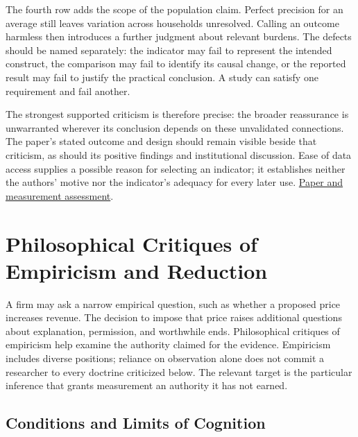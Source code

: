 The fourth row adds the scope of the population claim. Perfect precision
for an average still leaves variation across households unresolved.
Calling an outcome harmless then introduces a further judgment about
relevant burdens. The defects should be named separately: the indicator
may fail to represent the intended construct, the comparison may fail to
identify its causal change, or the reported result may fail to justify
the practical conclusion. A study can satisfy one requirement and fail
another.

The strongest supported criticism is therefore precise: the broader
reassurance is unwarranted wherever its conclusion depends on these
unvalidated connections. The paper's stated outcome and design should
remain visible beside that criticism, as should its positive findings
and institutional discussion. Ease of data access supplies a possible
reason for selecting an indicator; it establishes neither the authors'
motive nor the indicator's adequacy for every later use.
\href{../01_Resources/41_Statistical_Claims_and_Decisions/INSTITUTIONAL_ASSESSMENT.md}{Paper
and measurement assessment}.


\hypertarget{M09-philosophical-critiques-of-empiricism-and-reduction}{%
\section{Philosophical Critiques of Empiricism and
Reduction}\label{M09-philosophical-critiques-of-empiricism-and-reduction}}

\noindent \noindent A firm may ask a narrow empirical question, such as whether a
proposed price increases revenue. The decision to impose that price
raises additional questions about explanation, permission, and
worthwhile ends. Philosophical critiques of empiricism help examine the
authority claimed for the evidence. Empiricism includes diverse
positions; reliance on observation alone does not commit a researcher to
every doctrine criticized below. The relevant target is the particular
inference that grants measurement an authority it has not earned.

\hypertarget{M09-conditions-and-limits-of-cognition}{%
\subsection{Conditions and Limits of
Cognition}\label{M09-conditions-and-limits-of-cognition}}

